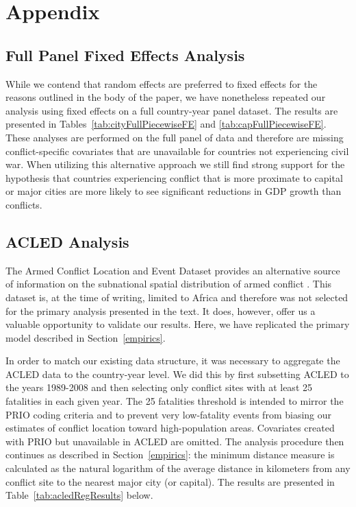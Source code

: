 
\newpage
\section{Appendix}
\label{appendix}

\subsection{Full Panel Fixed Effects Analysis}

While we contend that random effects are preferred to fixed effects for the reasons outlined in the body of the paper, we have nonetheless repeated our analysis using fixed effects on a full country-year panel dataset. The results are presented in Tables~\ref{tab:cityFullPiecewiseFE} and \ref{tab:capFullPiecewiseFE}. These analyses are performed on the full panel of data and therefore are missing conflict-specific covariates that are unavailable for countries not experiencing civil war. When utilizing this alternative approach we still find strong support for the hypothesis that countries experiencing conflict that is more proximate to capital or major cities are more likely to see significant reductions in GDP growth than conflicts.


\FloatBarrier


\FloatBarrier

\newpage
\subsection{ACLED Analysis}
\label{acled}

The Armed Conflict Location and Event Dataset provides an alternative source of information on the subnational spatial distribution of armed conflict \citep{raleigh:linke:etal:2010}. This dataset is, at the time of writing, limited to Africa and therefore was not selected for the primary analysis presented in the text. It does, however, offer us a valuable opportunity to validate our results. Here, we have replicated the primary model described in Section~\ref{empirics}.

In order to match our existing data structure, it was necessary to aggregate the ACLED data to the country-year level. We did this by first subsetting ACLED to the years 1989-2008 and then selecting only conflict sites with at least 25 fatalities in each given year. The 25 fatalities threshold is intended to mirror the PRIO coding criteria and to prevent very low-fatality events from biasing our estimates of conflict location toward high-population areas. Covariates created with PRIO but unavailable in ACLED are omitted. The analysis procedure then continues as described in Section~\ref{empirics}: the minimum distance measure is calculated as the natural logarithm of the average distance in kilometers from any conflict site to the nearest major city (or capital). The results are presented in Table~\ref{tab:acledRegResults} below. 


